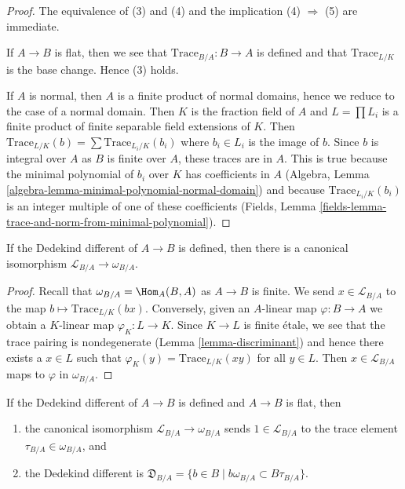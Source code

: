 \begin{proof}
The equivalence of (3) and (4) and the
implication (4) $\Rightarrow$ (5) are immediate.

\medskip\noindent
If $A \to B$ is flat, then we see that $\text{Trace}_{B/A} : B \to A$ is
defined and that $\text{Trace}_{L/K}$ is the base change. Hence (3) holds.

\medskip\noindent
If $A$ is normal, then $A$ is a finite product of normal domains,
hence we reduce to the case of a normal domain. Then $K$ is
the fraction field of $A$ and $L = \prod L_i$ is a finite product of
finite separable field extensions of $K$. Then
$\text{Trace}_{L/K}(b) = \sum \text{Trace}_{L_i/K}(b_i)$
where $b_i \in L_i$ is the image of $b$.
Since $b$ is integral over $A$ as $B$ is finite over $A$,
these traces are in $A$. This is true because the
minimal polynomial of $b_i$ over $K$ has coefficients in $A$
(Algebra, Lemma \ref{algebra-lemma-minimal-polynomial-normal-domain})
and because $\text{Trace}_{L_i/K}(b_i)$ is an
integer multiple of one of these coefficients
(Fields, Lemma \ref{fields-lemma-trace-and-norm-from-minimal-polynomial}).
\end{proof}

\begin{lemma}
\label{lemma-dedekind-complementary-module}
If the Dedekind different of $A \to B$ is defined, then
there is a canonical isomorphism
$\mathcal{L}_{B/A} \to \omega_{B/A}$.
\end{lemma}

\begin{proof}
Recall that $\omega_{B/A} = \Hom_A(B, A)$ as $A \to B$ is finite.
We send $x \in \mathcal{L}_{B/A}$ to the map
$b \mapsto \text{Trace}_{L/K}(bx)$.
Conversely, given an $A$-linear map $\varphi : B \to A$
we obtain a $K$-linear map $\varphi_K : L \to K$. Since $K \to L$ is finite
\'etale, we see that the trace pairing is nondegenerate
(Lemma \ref{lemma-discriminant}) and hence there exists a $x \in L$ such that
$\varphi_K(y) = \text{Trace}_{L/K}(xy)$ for all $y \in L$.
Then $x \in \mathcal{L}_{B/A}$ maps to $\varphi$ in $\omega_{B/A}$.
\end{proof}

\begin{lemma}
\label{lemma-flat-dedekind-complementary-module-trace}
If the Dedekind different of $A \to B$ is defined and $A \to B$ is flat, then
\begin{enumerate}
\item the canonical isomorphism $\mathcal{L}_{B/A} \to \omega_{B/A}$
sends $1 \in \mathcal{L}_{B/A}$ to the trace element
$\tau_{B/A} \in \omega_{B/A}$, and
\item the Dedekind different is
$\mathfrak{D}_{B/A} = \{b \in B \mid b\omega_{B/A} \subset B\tau_{B/A}\}$.
\end{enumerate}
\end{lemma}

